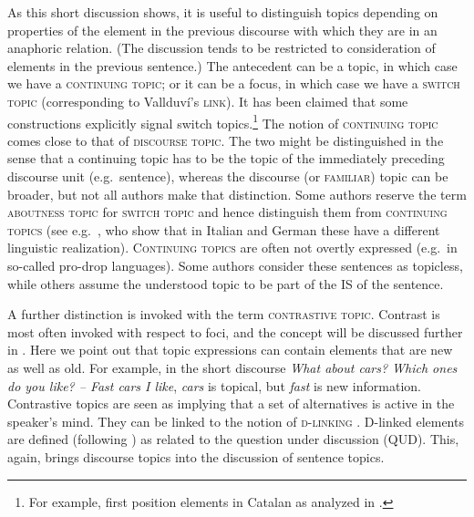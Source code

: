\documentclass[output=paper,hidelinks]{langscibook}
\begin{document}
As this short discussion shows, it is useful to distinguish topics depending on properties of the element in the previous discourse with which they are in an anaphoric relation. (The discussion tends to be restricted to consideration of elements in the previous sentence.) The antecedent can be a topic, in which case we have a \textsc{continuing topic}; or it can be a focus, in which case we have a \textsc{switch topic} (corresponding to Vallduv\'{i}'s \textsc{link}). It has been claimed that some constructions explicitly signal switch topics.\footnote{For example, first position elements in Catalan as analyzed in \citet{Vallduvi}.} The notion of \textsc{continuing topic} comes close to that of \textsc{discourse topic}. The two might be distinguished in the sense that a continuing topic has to be the topic of the immediately preceding discourse unit (e.g.\ sentence), whereas the discourse (or \textsc{familiar}) topic can be broader, but not all authors make that distinction. Some authors reserve the term \textsc{aboutness topic} for \textsc{switch topic} and hence distinguish them from \textsc{continuing topics} (see e.g.\ \citealt{FH}, who show that in Italian and German these have a different linguistic realization). \textsc{Continuing topics} are often not overtly expressed (e.g.\ in so-called pro-drop languages). Some authors consider these sentences as topicless, while others assume the understood topic to be part of the IS of the sentence.

A further distinction is invoked with the term \textsc{contrastive topic}. Contrast is most often invoked with respect to foci, and the concept will be discussed further in . Here we point out that topic expressions can contain elements that are new as well as old. For example, in the short discourse \textit{What about cars? Which ones do you like? -- Fast cars I like}, \textit{cars} is topical, but \textit{fast} is new information. Contrastive topics are seen as implying that a set of alternatives is active in the speaker's mind. They can be linked to the notion of \textsc{d-linking} \citep{Pesetsky}. D-linked elements are defined (following \citealt{Buring2003}) as related to the question under discussion ({QUD}). This, again, brings discourse topics into the discussion of sentence topics.
\end{document}

